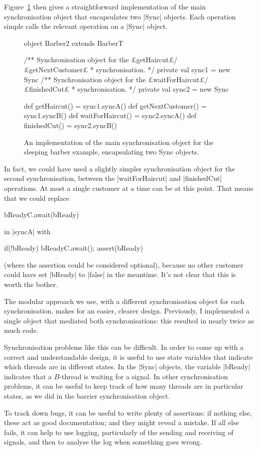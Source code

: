 Figure~\ref{fig:Barber2} then gives a straightforward implementation of the
main synchronisation object that encapsulates two |Sync| objects.  Each
operation simple calls the relevant operation on a |Sync| object.


\begin{figure}
\begin{scala}
object Barber2 extends BarberT{
  /** Synchronisation object for the £getHaircut£/£getNextCustomer£
    * synchronisation. */
  private val sync1 = new Sync
  /** Synchronisation object for the £waitForHaircut£/£finishedCut£
    * synchronisation. */
  private val sync2 = new Sync

  def getHaircut() = sync1.syncA()
  def getNextCustomer() = sync1.syncB()
  def waitForHaircut() = sync2.syncA()
  def finishedCut() = sync2.syncB()
}
\end{scala}
\caption{An implementation of the main synchronisation object for the sleeping
  barber example, encapsulating two {\scalastyle Sync} objects.}
\label{fig:Barber2}
\end{figure}


In fact, we could have used a slightly simpler synchronisation object for the
second synchronisation, between the |waitForHaircut| and |finishedCut|
operations.  At most a single customer at a time can be at this point.  That
means that we could replace
\begin{scala}
  bReadyC.await(bReady)
\end{scala}
in |syncA| with
\begin{scala}
  if(!bReady) bReadyC.await(); assert(bReady)
\end{scala}
(where the assertion could be considered optional), because no other customer
could have set |bReady| to |false| in the meantime.  It's not clear that this
is worth the bother.



The modular approach we use, with a different synchronisation object for each
synchronisation, makes for an easier, clearer design.  Previously, I
implemented a single object that mediated both synchronisations: this resulted
in nearly twice as much code.

Synchronisation problems like this can be difficult.  In order to come up with
a correct and understandable design, it is useful to use state variables that
indicate which threads are in different states.  In the |Sync| objects, the
variable |bReady| indicates that a $B$-thread is waiting for a signal.  In
other synchronisation problems, it can be useful to keep track of how many
threads are in particular states, as we did in the barrier synchronisation
object.

To track down bugs, it can be useful to write plenty of assertions: if nothing
else, these act as good documentation; and they might reveal a mistake.  If
all else fails, it can help to use logging, particularly of the sending and
receiving of signals, and then to analyse the log when something goes wrong.
